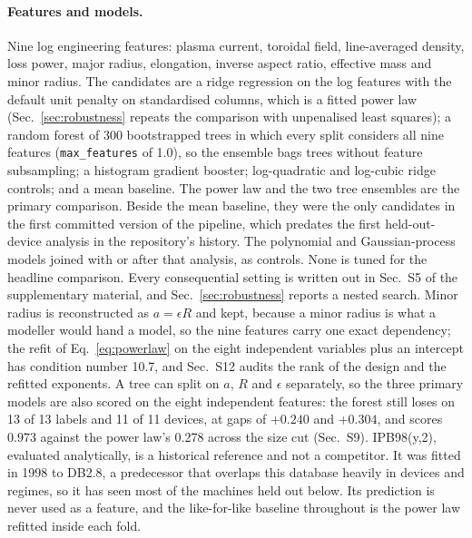 \documentclass[aip,pop,preprint,amsmath,amssymb]{revtex4-2}
\begin{document}
\paragraph{Features and models.} Nine log engineering features: plasma current,
toroidal field, line-averaged density, loss power, major radius, elongation,
inverse aspect ratio, effective mass and minor radius. The candidates are a
ridge regression on the log features with the default unit penalty on
standardised columns, which is a fitted power law (Sec.~\ref{sec:robustness}
repeats the comparison with unpenalised least squares); a random forest of 300
bootstrapped trees\cite{breiman} in which every split considers all nine
features (\texttt{max\_features} of 1.0), so the ensemble bags trees without
feature subsampling; a histogram
gradient booster; log-quadratic and log-cubic ridge
controls; and a mean baseline. The power law and the two tree ensembles are
the primary comparison. Beside the mean baseline, they were the only candidates
in the first committed version of the pipeline, which predates the first
held-out-device analysis in the repository's history. The polynomial and
Gaussian-process models joined with or after that analysis, as controls. None
is tuned for the headline comparison. Every
consequential setting is written out in Sec.~S5 of the supplementary material,
and Sec.~\ref{sec:robustness} reports a nested search. Minor radius is
reconstructed as $a=\epsilon R$ and kept, because a minor radius is what a
modeller would hand a model, so the nine features carry one exact dependency;
the refit of Eq.~\eqref{eq:powerlaw} on the eight independent variables plus
an intercept has condition number 10.7, and Sec.~S12 audits the rank of the
design and the refitted exponents. A tree can split on $a$, $R$ and
$\epsilon$ separately, so the three primary models are also scored on the
eight independent features: the forest still loses on 13 of 13 labels and 11
of 11 devices, at gaps of $+0.240$ and $+0.304$, and scores 0.973 against the
power law's 0.278 across the size cut (Sec.~S9). IPB98(y,2), evaluated analytically, is a historical reference and
not a competitor. It was fitted in 1998 to DB2.8, a predecessor that overlaps
this database heavily in devices and regimes\cite{hdb5}, so it has seen most
of the machines held out below. Its prediction is never used as a feature, and
the like-for-like baseline throughout is the power law refitted inside each
fold.
\end{document}
